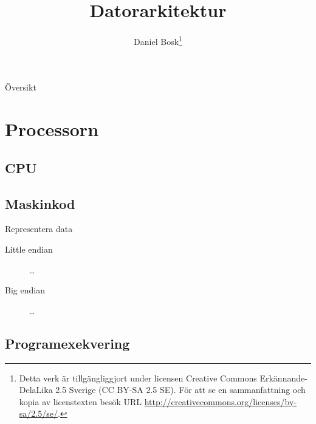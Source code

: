 \documentclass{beamer}
\title{%
  Datorarkitektur
}
\author{Daniel Bosk\footnote{%
  \tiny
  Detta verk är tillgängliggjort under licensen Creative Commons 
  Erkännande-DelaLika 2.5 Sverige (CC BY-SA 2.5 SE).
  För att se en sammanfattning och kopia av licenstexten besök URL 
  \url{http://creativecommons.org/licenses/by-sa/2.5/se/}.
}}
\institute[MIUN IKS]{%
  Avdelningen för informations- och kommunikationssytem (IKS),\\
  Mittuniversitetet, Sundsvall.
}
\date{\svnId}
\theoremstyle{definition}
\theoremstyle{remark}
\begin{document}
\begin{frame}
  \titlepage
\end{frame}

\begin{frame}{Översikt}
  \tableofcontents
\end{frame}

\begin{frame}
  
\end{frame}





\section{Processorn}

\subsection{CPU}

\begin{frame}{\insertsubsectionhead}
\end{frame}

\subsection{Maskinkod}

\begin{frame}{\insertsubsectionhead}
\end{frame}

\begin{frame}{\insertsubsectionhead}{Representera data}
  \begin{description}
    \item[Little endian] \dots
    \item[Big endian] \dots
  \end{description}
\end{frame}

\subsection{Programexekvering}
\end{document}
